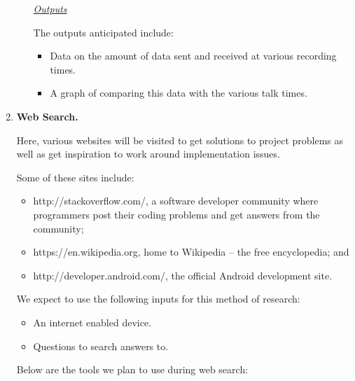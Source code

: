 \documentclass[12pt,svgnames,smaller]{article} %
\begin{document}
\begin{enumerate}
\begin{enumerate}
\begin{enumerate}
			\end{enumerate}
			
			\emph{\underline{\textsf{Outputs}}}
			
			The outputs anticipated include:
			
			\begin{itemize}
				\item Data on the amount of data sent and received at various recording times.
				\item A graph of comparing this data with the various talk times. 
			\end{itemize}
			
			
		\end{enumerate}
		
		
		
		\item \textbf{Web Search.}
		
		Here, various websites will be visited to get solutions to project problems as well as get inspiration to work around implementation issues.
		
		Some of these sites include:
		
		\begin{itemize}
			\item http://stackoverflow.com/, a software developer community where programmers post their coding problems and get answers from the community;
			\item https://en.wikipedia.org, home to Wikipedia –  the free encyclopedia; and
			\item http://developer.android.com/, the official Android development site.
		\end{itemize}
		
		We expect to use the following inputs for this method of research:
		
		\begin{itemize}
			\item An internet enabled device.
			\item Questions to search answers to.
		\end{itemize}
		
		Below are the tools we plan to use during web search:
		

\end{enumerate}
\end{document}
